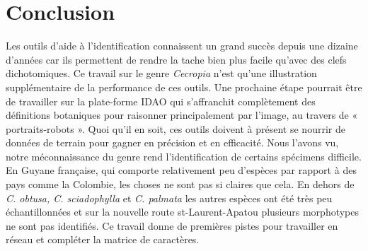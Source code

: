 \documentclass[a4paper]{article}
\theoremstyle{definition}
\theoremstyle{definition}
\theoremstyle{definition}
\theoremstyle{remark}
\begin{document}
\section{Conclusion}\label{conclusion}

Les outils d'aide à l'identification connaissent un grand succès depuis
une dizaine d'années car ils permettent de rendre la tache bien plus
facile qu'avec des clefs dichotomiques. Ce travail sur le genre
\emph{Cecropia} n'est qu'une illustration supplémentaire de la
performance de ces outils. Une prochaine étape pourrait être de
travailler sur la plate-forme IDAO qui s'affranchit complètement des
définitions botaniques pour raisonner principalement par l'image, au
travers de « portraits-robots ». Quoi qu'il en soit, ces outils doivent
à présent se nourrir de données de terrain pour gagner en précision et
en efficacité. Nous l'avons vu, notre méconnaissance du genre rend
l'identification de certains spécimens difficile. En Guyane française,
qui comporte relativement peu d'espèces par rapport à des pays comme la
Colombie, les choses ne sont pas si claires que cela. En dehors de
\emph{C. obtusa, C. sciadophylla} et \emph{C. palmata} les autres
espèces ont été très peu échantillonnées et sur la nouvelle route
st-Laurent-Apatou plusieurs morphotypes ne sont pas identifiés. Ce
travail donne de premières pistes pour travailler en réseau et compléter
la matrice de caractères. \pagebreak

\end{document}
